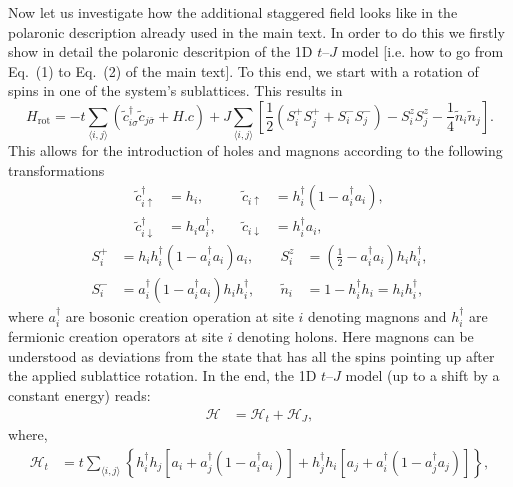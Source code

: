 \documentclass[%
 reprint,
 amsmath,amssymb,
 aps,
prl,
]{revtex4-1}
\newcommand{\mean}[1]{\langle#1\rangle}
\begin{document}
Now let us investigate how the additional staggered field looks like in the polaronic description already used in the main text. In order to 
do this we firstly show in detail the polaronic descritpion of the 1D $t$--$J$ model [i.e. how to go from Eq.~(1) to Eq.~(2) of the main text].
To this end, we start with a rotation of spins in one of the system's sublattices. This results in
%
\begin{equation}
	H_{\text{rot}} = -t\sum_{\mean{i,j}}\left(\tilde{c}_{i\sigma}^\dagger\tilde{c}_{j\bar{\sigma}} + H.c\right)
	+ J\sum_{\mean{i,j}}\left[\frac{1}{2}\left(S_i^+S_j^+ + S_i^-S_j^-\right) - S_i^zS_j^z - \frac{1}{4}\tilde{n}_i\tilde{n}_j\right].
\end{equation}
%
This allows for the introduction of holes and magnons according to the following transformations
%
\begin{equation}
	\begin{aligned}
	\tilde{c}_{i\uparrow}^\dag &= h_i, &\quad \tilde{c}_{i\uparrow} &= h_i^\dag (1 - a_i^\dag a_i), \\
	\tilde{c}_{i\downarrow}^\dag &= h_i a_i^\dag, &\quad \tilde{c}_{i\downarrow} &= h_i^\dag a_i,
	\end{aligned}
\end{equation}
%
\begin{equation}
	\begin{aligned}
		S_i^+ &= h_i h_i^\dag (1 - a_i^\dag a_i)a_i, &\quad S_i^z &= \left(\frac{1}{2} - a_i^\dag a_i \right) h_i h_i^\dag, \\
		S_i^- &= a_i^\dag (1 - a_i^\dag a_i) h_i h_i^\dag, &\quad \tilde{n}_i &= 1 - h_i^\dag h_i = h_i h_i^\dag,
	\end{aligned}
\end{equation}
where $a_i^\dag$ are bosonic creation operation at site $i$ denoting magnons and $h_i^\dag$ are fermionic creation operators at site $i$ denoting holons.
Here magnons can be understood as deviations from the state that has all the spins pointing up after the applied sublattice rotation. In the end, the 1D $t$--$J$ model (up to a shift by a constant energy) reads:
%
\begin{align}
	\mathcal{H} &= \mathcal{H}_{t} + \mathcal{H}_{J},
\end{align}
%
where,
%	
\begin{equation}
	\begin{split}
	\mathcal{H}_{t} &= t \sum_{\mean{i,j}} \left\{h_i^\dag h_j \left[ a_i + a_j^\dag (1 -  a_i^\dag a_i) \right] + h_j^\dag h_i \left[ a_j + a_i^\dag (1 -  a_j^\dag a_j) \right]\right\},
	\end{split}
	\label{eq:ht}
\end{equation}
\end{document}

